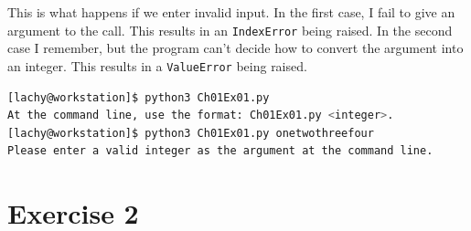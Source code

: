 \documentclass{report}
\begin{document}
\noindent This is what happens if we enter invalid input. In the first case, I fail to give an argument to the call. This results in an \verb|IndexError| being raised. In the second case I remember, but the program can't decide how to convert the argument into an integer. This results in a \verb|ValueError| being raised.
\begin{lstlisting}[language=bash, style=terminalStyle]
[lachy@workstation]$ python3 Ch01Ex01.py
At the command line, use the format: Ch01Ex01.py <integer>.
[lachy@workstation]$ python3 Ch01Ex01.py onetwothreefour
Please enter a valid integer as the argument at the command line.
\end{lstlisting}

\section*{Exercise 2}
\end{document}
